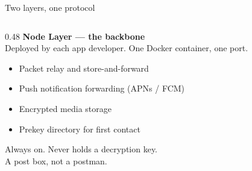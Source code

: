 \documentclass[aspectratio=169, 11pt]{beamer}
\begin{document}
\begin{frame}{Two layers, one protocol}
\begin{columns}[T]
  \begin{column}{0.48\textwidth}
    \vspace{1mm}
    {\color{mwaccent}\textbf{Node Layer — the backbone}}\\[3pt]
    \small
    Deployed by each app developer. One Docker container, one port.
    \begin{itemize}\small
      \item Packet relay and store-and-forward
      \item Push notification forwarding (APNs / FCM)
      \item Encrypted media storage
      \item Prekey directory for first contact
    \end{itemize}
    \vspace{4pt}
    Always on. Never holds a decryption key.\\
    A post box, not a postman.
    \vspace{6pt}


\end{column}
\end{columns}
\end{frame}
\end{document}
